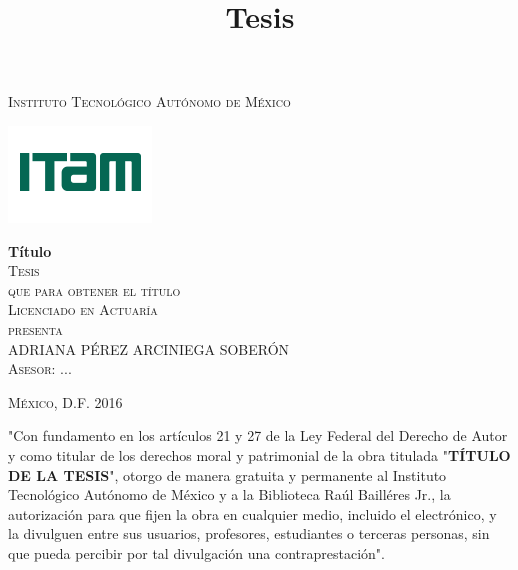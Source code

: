 \documentclass[letterpaper,onside,11pt,review]{book}
\theoremstyle{plain}
\begin{document}
\pagestyle{empty} %

\title{Tesis} %

\begin{titlepage}
\begin{center}

\textsc{\Large Instituto Tecnol\'ogico Aut\'onomo de M\'exico}\\[4em]

\begin{center}
	\includegraphics{DocumentosLaTex/ITAM_2016}
\end{center}

\vspace{4em}

{\sc \huge {\bf T\'itulo}}\\[4em]

\textsc{\large Tesis}\\[1em]

\textsc{que para obtener el t\'itulo}\\[1em]

\textsc{Licenciado en Actuar\'ia}\\[1em]

\textsc{presenta}\\[1em]

\textsc{\Large ADRIANA P\'EREZ ARCINIEGA SOBER\'ON }\\[1em]

\textsc{\large Asesor: ...}

\end{center}

\vspace*{\fill}
\textsc{M\'exico, D.F. \hspace*{\fill} 2016}

\end{titlepage}


\thispagestyle{empty}
\vspace*{\fill}
\begingroup
"Con fundamento en los art\'iculos 21 y 27 de la Ley Federal del Derecho de Autor y como titular de los derechos moral y patrimonial de la obra titulada "\textbf{T\'ITULO DE LA TESIS}", otorgo de manera gratuita y permanente al Instituto Tecnol\'ogico Aut\'onomo de M\'exico y a la Biblioteca Ra\'ul Baill\'eres Jr., la autorizaci\'on para que fijen la obra en cualquier medio, incluido el electr\'onico, y la divulguen entre sus usuarios, profesores, estudiantes o terceras personas, sin que pueda percibir por tal divulgaci\'on una contraprestaci\'on".
\end{document}
